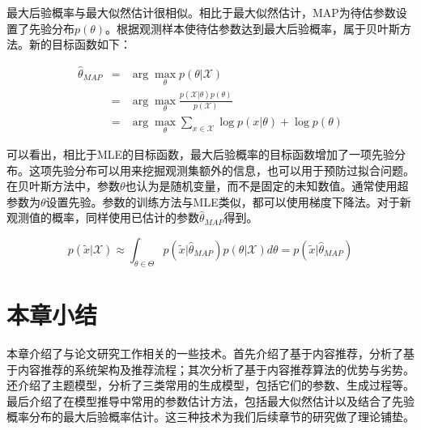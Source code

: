 最大后验概率与最大似然估计很相似。相比于最大似然估计，MAP为待估参数设置了先验分布$p(\theta)$。根据观测样本使待估参数达到最大后验概率，属于贝叶斯方法。新的目标函数如下：

\begin{eqnarray}
	\hat{\theta}_{MAP} &=& \arg\max_\theta p(\theta|\mathcal{X}) \nonumber \\
	&=& \arg\max_\theta \frac{p(\mathcal{X}|\theta)p(\theta)}{p(\mathcal{X})} \nonumber \\
	&=& \arg\max_\theta {\sum_{x \in \mathcal{X}}\log p(x|\theta) + \log p(\theta)}
\end{eqnarray}

可以看出，相比于MLE的目标函数，最大后验概率的目标函数增加了一项先验分布。这项先验分布可以用来挖掘观测集额外的信息，也可以用于预防过拟合问题。在贝叶斯方法中，参数$\theta$也认为是随机变量，而不是固定的未知数值。通常使用超参数为$\theta$设置先验。参数的训练方法与MLE类似，都可以使用梯度下降法。对于新观测值的概率，同样使用已估计的参数$\hat{\theta}_{MAP}$得到。

\begin{equation}
p(\tilde{x}|\mathcal{X}) \approx \int_{\theta \in \Theta}p(\tilde{x}|\hat{\theta}_{MAP})p(\theta|\mathcal{X})d\theta = p(\tilde{x}|\hat{\theta}_{MAP})
\end{equation}

\section{本章小结}
本章介绍了与论文研究工作相关的一些技术。首先介绍了基于内容推荐，分析了基于内容推荐的系统架构及推荐流程；其次分析了基于内容推荐算法的优势与劣势。还介绍了主题模型，分析了三类常用的生成模型，包括它们的参数、生成过程等。最后介绍了在模型推导中常用的参数估计方法，包括最大似然估计以及结合了先验概率分布的最大后验概率估计。这三种技术为我们后续章节的研究做了理论铺垫。









